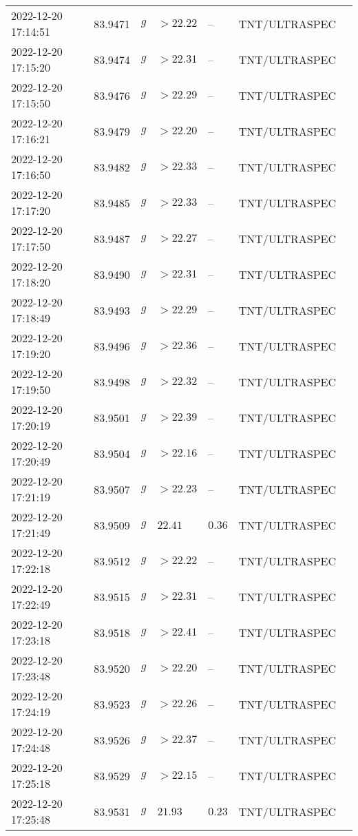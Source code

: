 \documentclass{nature_plusfigure}
\begin{document}
\begin{supplement}
\begin{center}
\begin{longtable}{lllllll}
2022-12-20 17:14:51 & 83.9471 & $g$ & $>22.22$ & -- & TNT/ULTRASPEC &  \\ 
2022-12-20 17:15:20 & 83.9474 & $g$ & $>22.31$ & -- & TNT/ULTRASPEC &  \\ 
2022-12-20 17:15:50 & 83.9476 & $g$ & $>22.29$ & -- & TNT/ULTRASPEC &  \\ 
2022-12-20 17:16:21 & 83.9479 & $g$ & $>22.20$ & -- & TNT/ULTRASPEC &  \\ 
2022-12-20 17:16:50 & 83.9482 & $g$ & $>22.33$ & -- & TNT/ULTRASPEC &  \\ 
2022-12-20 17:17:20 & 83.9485 & $g$ & $>22.33$ & -- & TNT/ULTRASPEC &  \\ 
2022-12-20 17:17:50 & 83.9487 & $g$ & $>22.27$ & -- & TNT/ULTRASPEC &  \\ 
2022-12-20 17:18:20 & 83.9490 & $g$ & $>22.31$ & -- & TNT/ULTRASPEC &  \\ 
2022-12-20 17:18:49 & 83.9493 & $g$ & $>22.29$ & -- & TNT/ULTRASPEC &  \\ 
2022-12-20 17:19:20 & 83.9496 & $g$ & $>22.36$ & -- & TNT/ULTRASPEC &  \\ 
2022-12-20 17:19:50 & 83.9498 & $g$ & $>22.32$ & -- & TNT/ULTRASPEC &  \\ 
2022-12-20 17:20:19 & 83.9501 & $g$ & $>22.39$ & -- & TNT/ULTRASPEC &  \\ 
2022-12-20 17:20:49 & 83.9504 & $g$ & $>22.16$ & -- & TNT/ULTRASPEC &  \\ 
2022-12-20 17:21:19 & 83.9507 & $g$ & $>22.23$ & -- & TNT/ULTRASPEC &  \\ 
2022-12-20 17:21:49 & 83.9509 & $g$ & $22.41$ & $0.36$ & TNT/ULTRASPEC &  \\ 
2022-12-20 17:22:18 & 83.9512 & $g$ & $>22.22$ & -- & TNT/ULTRASPEC &  \\ 
2022-12-20 17:22:49 & 83.9515 & $g$ & $>22.31$ & -- & TNT/ULTRASPEC &  \\ 
2022-12-20 17:23:18 & 83.9518 & $g$ & $>22.41$ & -- & TNT/ULTRASPEC &  \\ 
2022-12-20 17:23:48 & 83.9520 & $g$ & $>22.20$ & -- & TNT/ULTRASPEC &  \\ 
2022-12-20 17:24:19 & 83.9523 & $g$ & $>22.26$ & -- & TNT/ULTRASPEC &  \\ 
2022-12-20 17:24:48 & 83.9526 & $g$ & $>22.37$ & -- & TNT/ULTRASPEC &  \\ 
2022-12-20 17:25:18 & 83.9529 & $g$ & $>22.15$ & -- & TNT/ULTRASPEC &  \\ 
2022-12-20 17:25:48 & 83.9531 & $g$ & $21.93$ & $0.23$ & TNT/ULTRASPEC &  \\ 

\end{longtable}
\end{center}
\end{supplement}
\end{document}
